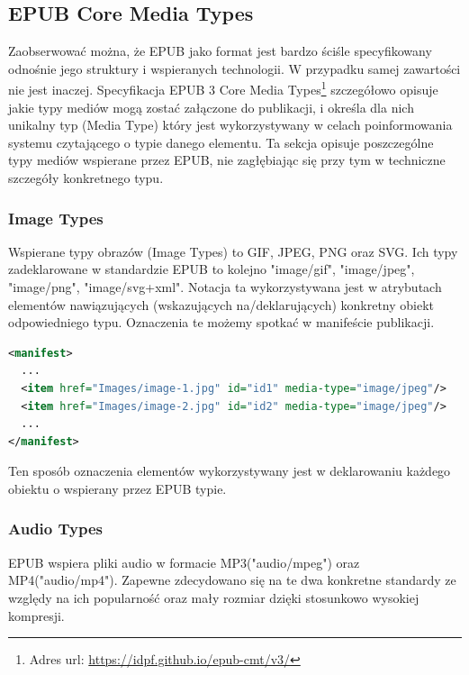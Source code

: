 \subsection{EPUB Core Media Types}

Zaobserwować można, że EPUB jako format jest bardzo ściśle specyfikowany odnośnie jego struktury i wspieranych technologii. W przypadku samej zawartości nie jest inaczej. Specyfikacja EPUB 3 Core Media Types\footnote{Adres url: \href{https://idpf.github.io/epub-cmt/v3/}{https://idpf.github.io/epub-cmt/v3/}} szczegółowo opisuje jakie typy mediów mogą zostać załączone do publikacji, i określa dla nich unikalny typ (Media Type) który jest wykorzystywany w celach poinformowania systemu czytającego o typie danego elementu. Ta sekcja opisuje poszczególne typy mediów wspierane przez EPUB, nie zagłębiając się przy tym w techniczne szczegóły konkretnego typu.

\subsubsection*{Image Types}

Wspierane typy obrazów (Image Types) to GIF, JPEG, PNG oraz SVG. Ich typy zadeklarowane w standardzie EPUB to kolejno "image/gif", "image/jpeg", "image/png", "image/svg+xml". Notacja ta wykorzystywana jest w atrybutach elementów nawiązujących (wskazujących na/deklarujących) konkretny obiekt odpowiedniego typu. Oznaczenia te możemy spotkać w manifeście publikacji.

\begin{lstlisting}[caption={Przykładowy fragment manifestu znajdującego się w pliku content.opf}, language=XML]
<manifest>
  ...
  <item href="Images/image-1.jpg" id="id1" media-type="image/jpeg"/>
  <item href="Images/image-2.jpg" id="id2" media-type="image/jpeg"/>
  ...
</manifest>
\end{lstlisting}

Ten sposób oznaczenia elementów wykorzystywany jest w deklarowaniu każdego obiektu o wspierany przez EPUB typie.

\subsubsection*{Audio Types}

EPUB wspiera pliki audio w formacie MP3("audio/mpeg") oraz MP4("audio/mp4"). Zapewne zdecydowano się na te dwa konkretne standardy ze względy na ich popularność oraz mały rozmiar dzięki stosunkowo wysokiej kompresji.


